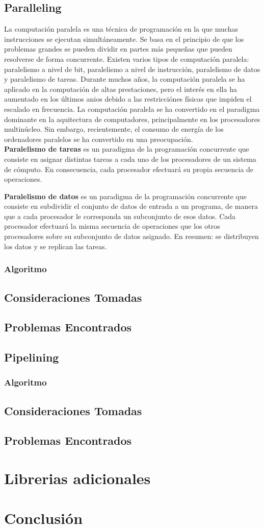\documentclass[10pt,a4paper]{report}
\begin{document}
\subsection{Paralleling}
La computaci\'on paralela es una t\'ecnica de programaci\'on en la que muchas instrucciones se ejecutan simult\'aneamente. Se basa en el principio de que los problemas grandes se pueden dividir en partes m\'as peque\~nas que pueden resolverse de forma concurrente. Existen varios tipos de computaci\'on paralela: paralelismo a nivel de bit, paralelismo a nivel de instrucci\'on, paralelismo de datos y paralelismo de tareas. Durante muchos a\~nos, la computaci\'on paralela se ha aplicado en la computaci\'on de altas prestaciones, pero el inter\'es en ella ha aumentado en los \'ultimos anios debido a las restricci\'ones f\'isicas que impiden el escalado en frecuencia. La computaci\'on paralela se ha convertido en el paradigma dominante en la aquitectura de computadores, principalmente en los procesadores multin\'ucleo. Sin embargo, recientemente, el consumo de energ\'ia de los ordenadores paralelos se ha convertido en una preocupaci\'on.\\

\textbf{Paralelismo de tareas} es un paradigma de la programaci\'on concurrente que consiste en asignar distintas tareas a cada uno de los procesadores de un sistema de c\'omputo. En consecuencia, cada procesador efectuar\'a su propia secuencia de operaciones.

\textbf{Paralelismo de datos} es un paradigma de la programación concurrente que consiste en subdividir el conjunto de datos de entrada a un programa, de manera que a cada procesador le corresponda un subconjunto de esos datos. Cada procesador efectuará la misma secuencia de operaciones que los otros procesadores sobre su subconjunto de datos asignado. En resumen: se distribuyen los datos y se replican las tareas.

\subsubsection{Algoritmo}
\subsection{Consideraciones Tomadas}
\subsection{Problemas Encontrados}
\subsection{Pipelining}
\subsubsection{Algoritmo}
\subsection{Consideraciones Tomadas}
\subsection{Problemas Encontrados}
\section{Librerias adicionales}
\section{Conclusi\'on}
\end{document}
